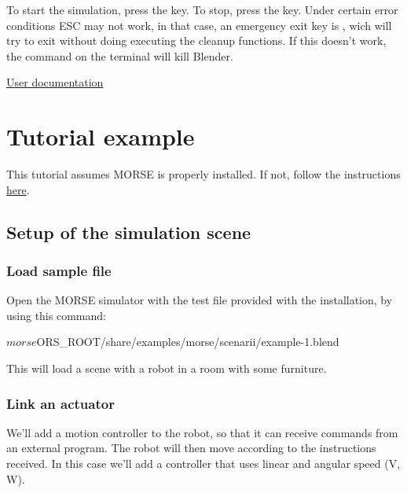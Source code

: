 \documentclass[twoside,a4paper,10pt]{report}
\newcommand{\dokutitlelevelone}[1]{\chapter{#1}}
\newcommand{\dokutitleleveltwo}[1]{\section{#1}}
\newcommand{\dokutitleleveltree}[1]{\subsection{#1}}
\newcommand{\dokuquoting}{\textbar}
\begin{document}
To start the simulation, press the  key.
To stop, press the  key. Under certain error conditions ESC may 
not work, in that case, an emergency exit key is , wich will try 
to exit without doing executing the cleanup functions. If this doesn't work, the
 command  on the terminal will kill Blender.

{\dokuquoting}{\dokuquoting} \hyperref[a80da1282f2c775bbc5f2c92c836968b]{ User documentation}


\dokutitlelevelone{Tutorial example}
\label{d0e1bed8b40ec8e4f9cc0cc0a11ff110}%
\label{0575c8d592fb7b088226750aceec2b4e}%

This tutorial assumes MORSE is properly installed. If not, follow the instructions \hyperref[ea09bb364ef1bffd889e76b7a59035fc]{ here}.


\dokutitleleveltwo{Setup of the simulation scene}
\label{80527725485ea9e7bedbc9d918895a02}%

\dokutitleleveltree{Load sample file}
\label{4238ab1e3d8f80f2fdec7f34e17e0f67}%

Open the MORSE simulator with the test file provided with the installation, by using this command:



\small
\begin{verbatimtab}
$ morse $ORS_ROOT/share/examples/morse/scenarii/example-1.blend
\end{verbatimtab}
\normalsize

This will load a scene with a robot in a room with some furniture.


\dokutitleleveltree{Link an actuator}
\label{81c6b973417d3e5000d27d9c1c805b96}%

We'll add a motion controller to the robot, so that it can receive commands from an external program. The robot will then move according to the instructions received. In this case we'll add a controller that uses linear and angular speed (V, W).
\end{document}
